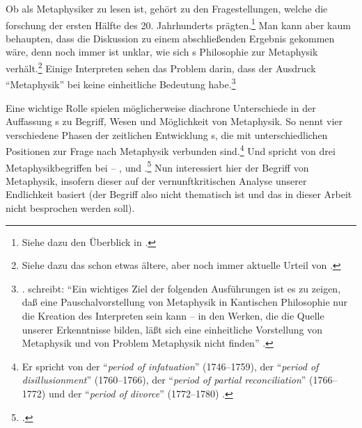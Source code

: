 
Ob  als Metaphysiker zu lesen ist, gehört zu den
Fragestellungen, welche die forschung der ersten Hälfte des
20. Jahrhunderts prägten.\footnote{Siehe dazu den Überblick in
\cite{Funke:DieDiskussionumdiemetaphysischeKantinterpretation1976}.} Man kann
aber kaum behaupten, dass die Diskussion zu einem abschließenden Ergebnis
gekommen wäre, denn noch immer ist unklar, wie sich s
Philosophie zur Metaphysik verhält.\footnote{Siehe dazu das schon etwas ältere,
aber noch immer aktuelle Urteil von
\textcite[vgl.][372]{Walsh:KantandMetaphysics1976}.} Einige Interpreten sehen
das Problem darin, dass der Ausdruck \enquote{Metaphysik} bei
 keine einheitliche Bedeutung
habe.\footnote{\cite[Vgl.
bspw.][\pno~26\,f.]{Beiser:Kantsintellectualdevelopment1992}.
 schreibt: \enquote{Ein wichtiges Ziel der folgenden Ausführungen ist es zu zeigen, daß eine Pauschalvorstellung von  Metaphysik in  Kantischen Philosophie nur die Kreation des
Interpreten sein kann -- in den Werken, die die Quelle unserer Erkenntnisse
bilden, läßt sich eine einheitliche Vorstellung von Metaphysik und von 
Problem  Metaphysik nicht finden}
\parencite[][77]{Brandt:KantalsMetaphysiker1990}.}

Eine wichtige Rolle spielen möglicherweise diachrone Unterschiede in der
Auffassung s zu Begriff, Wesen und Möglichkeit von
Metaphysik. So nennt 
vier verschiedene Phasen der zeitlichen Entwicklung s, die
mit unterschiedlichen Positionen zur Frage nach Metaphysik verbunden
sind.\footnote{Er spricht von der \enquote{\emph{period of infatuation}} (1746--1759),
der \enquote{\emph{period of disillusionment}} (1760--1766), der \enquote{\emph{period of partial
reconciliation}} (1766--1772) und der \enquote{\emph{period of divorce}} (1772--1780)
\parencite[vgl.][26]{Beiser:Kantsintellectualdevelopment1992}.} Und
 spricht von drei
Metaphysikbegriffen bei  -- ,
 und
.\footnote{\cite[Vgl.][]{Foerster:KantsMetaphysikbegriff1987}.}
Nun interessiert hier der  Begriff von
Metaphysik, insofern dieser auf der vernunftkritischen Analyse
unserer Endlichkeit basiert (der 
Begriff also nicht thematisch ist und das 
in dieser Arbeit nicht besprochen werden soll).

